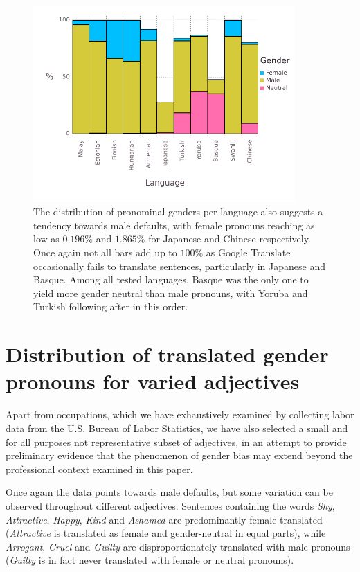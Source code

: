 \documentclass[fleqn,10pt]{article}
\begin{document}
\begin{figure}[H]
	\centering
	\includegraphics[width=10cm]{pictures/gender-by-language}
	\caption{The distribution of pronominal genders per language also suggests a tendency towards male defaults, with female pronouns reaching as low as $0.196\%$ and $1.865\%$ for Japanese and Chinese respectively. Once again not all bars add up to $100\%$ as Google Translate occasionally fails to translate sentences, particularly in Japanese and Basque. Among all tested languages, Basque was the only one to yield more gender neutral than male pronouns, with Yoruba and Turkish following after in this order.}
	\label{fig:gender-by-language}
\end{figure}

\section{Distribution of translated gender pronouns for varied adjectives}

Apart from occupations, which we have exhaustively examined by collecting labor data from the U.S. Bureau of Labor Statistics, we have also selected a small and for all purposes not representative subset of adjectives, in an attempt to provide preliminary evidence that the phenomenon of gender bias may extend beyond the professional context examined in this paper.

Once again the data points towards male defaults, but some variation can be observed throughout different adjectives. Sentences containing the words \emph{Shy}, \emph{Attractive}, \emph{Happy}, \emph{Kind} and \emph{Ashamed} are predominantly female translated (\emph{Attractive} is translated as female and gender-neutral in equal parts), while \emph{Arrogant}, \emph{Cruel} and \emph{Guilty} are disproportionately translated with male pronouns (\emph{Guilty} is in fact never translated with female or neutral pronouns).
\end{document}
